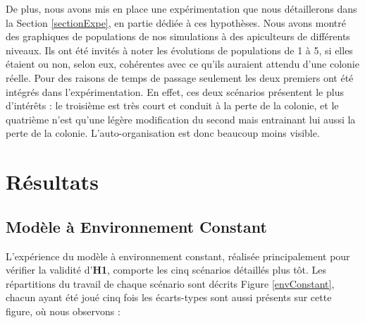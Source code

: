 			De plus, nous avons mis en place une expérimentation que nous détaillerons dans la Section \ref{sectionExpe}, en partie dédiée à ces hypothèses. Nous avons montré des graphiques de populations de nos simulations à des apiculteurs de différents niveaux. Ils ont été invités à noter les évolutions de populations de 1 à 5, si elles étaient ou non, selon eux, cohérentes avec ce qu'ils auraient attendu d'une colonie réelle. Pour des raisons de temps de passage seulement les deux premiers ont été intégrés dans l'expérimentation. En effet, ces deux scénarios présentent le plus d'intérêts : le troisième est très court et conduit à la perte de la colonie, et le quatrième n'est qu'une légère modification du second mais entrainant lui aussi la perte de la colonie. L'auto-organisation est donc beaucoup moins visible.
				
			
	\section{Résultats}
	
	\subsection{Modèle à Environnement Constant}
	
	L'expérience du modèle à environnement constant, réalisée principalement pour vérifier la validité d'\textbf{H1}, comporte les cinq scénarios détaillés plus tôt. Les répartitions du travail de chaque scénario sont décrits Figure \ref{envConstant}, chacun ayant été joué cinq fois les écarts-types sont aussi présents sur cette figure, où nous observons :
	
